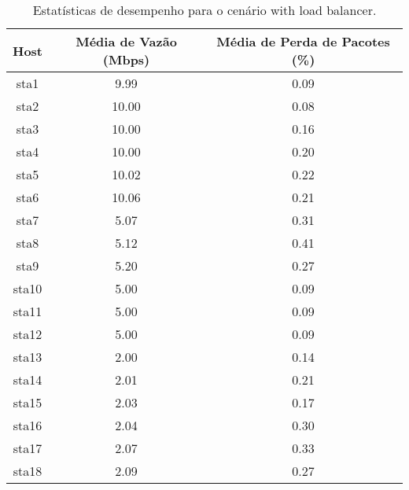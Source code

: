 \begin{table}[htbp]
    \centering
    \label{tab:with_load_balancer_stats}
    \begin{tabular}{|c|c|c|}
        \hline
        \textbf{Host} & \textbf{Média de Vazão (Mbps)} & \textbf{Média de Perda de Pacotes (\%)} \\ \hline
        sta1 & 9.99 & 0.09 \\ \hline
        sta2 & 10.00 & 0.08 \\ \hline
        sta3 & 10.00 & 0.16 \\ \hline
        sta4 & 10.00 & 0.20 \\ \hline
        sta5 & 10.02 & 0.22 \\ \hline
        sta6 & 10.06 & 0.21 \\ \hline
        sta7 & 5.07 & 0.31 \\ \hline
        sta8 & 5.12 & 0.41 \\ \hline
        sta9 & 5.20 & 0.27 \\ \hline
        sta10 & 5.00 & 0.09 \\ \hline
        sta11 & 5.00 & 0.09 \\ \hline
        sta12 & 5.00 & 0.09 \\ \hline
        sta13 & 2.00 & 0.14 \\ \hline
        sta14 & 2.01 & 0.21 \\ \hline
        sta15 & 2.03 & 0.17 \\ \hline
        sta16 & 2.04 & 0.30 \\ \hline
        sta17 & 2.07 & 0.33 \\ \hline
        sta18 & 2.09 & 0.27 \\ \hline
    \end{tabular}
    \caption{Estatísticas de desempenho para o cenário with load balancer.}
\end{table}

